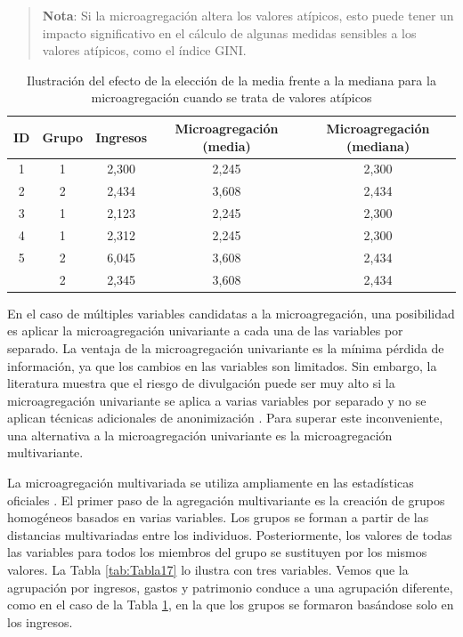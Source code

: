 \documentclass[]{book}
\theoremstyle{definition}
\theoremstyle{definition}
\theoremstyle{definition}
\theoremstyle{definition}
\theoremstyle{remark}
\begin{document}
\begin{quote}
\textbf{Nota}: Si la microagregación altera los valores atípicos, esto puede tener un impacto significativo en el cálculo de algunas medidas sensibles a los valores atípicos, como el índice GINI.
\end{quote}

\begin{table}

\caption{\label{tab:Tabla16}\label{tab:Tabla16}Ilustración del efecto de la elección de la media frente a la mediana para la microagregación cuando se trata de valores atípicos}
\centering
\begin{tabular}[t]{ccccc}
\toprule
ID & Grupo & Ingresos & Microagregación (media) & Microagregación (mediana)\\
\midrule
1 & 1 & 2,300 & 2,245 & 2,300\\
2 & 2 & 2,434 & 3,608 & 2,434\\
3 & 1 & 2,123 & 2,245 & 2,300\\
4 & 1 & 2,312 & 2,245 & 2,300\\
5 & 2 & 6,045 & 3,608 & 2,434\\
\addlinespace
6 & 2 & 2,345 & 3,608 & 2,434\\
\bottomrule
\end{tabular}
\end{table}

En el caso de múltiples variables candidatas a la microagregación, una posibilidad es aplicar la microagregación univariante a cada una de las variables por separado. La ventaja de la microagregación univariante es la mínima pérdida de información, ya que los cambios en las variables son limitados. Sin embargo, la literatura muestra que el riesgo de divulgación puede ser muy alto si la microagregación univariante se aplica a varias variables por separado y no se aplican técnicas adicionales de anonimización \citep{DMOT02}. Para superar este inconveniente, una alternativa a la microagregación univariante es la microagregación multivariante.

La microagregación multivariada se utiliza ampliamente en las estadísticas oficiales \citep{benschop2019statistical}. El primer paso de la agregación multivariante es la creación de grupos homogéneos basados en varias variables. Los grupos se forman a partir de las distancias multivariadas entre los individuos. Posteriormente, los valores de todas las variables para todos los miembros del grupo se sustituyen por los mismos valores. La Tabla \ref{tab:Tabla17} lo ilustra con tres variables. Vemos que la agrupación por ingresos, gastos y patrimonio conduce a una agrupación diferente, como en el caso de la Tabla \ref{tab:Tabla16}, en la que los grupos se formaron basándose solo en los ingresos.
\end{document}
